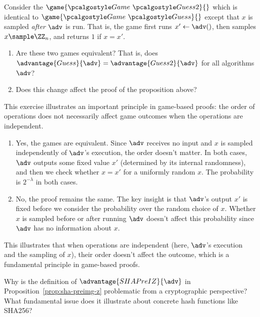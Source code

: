 \begin{exercise}\label{ex:guessing-game-equivalence}
  Consider the $\game{\Game~\algo{Guess2}}{}$ which is identical to $\game{\Game~\algo{Guess}}{}$ except that $x$ is sampled \emph{after} $\adv$ is run.
  That is, the game first runs $x' \gets \adv()$, then samples $x \sample \ZZ_n$, and returns $1$ if $x = x'$.
  \begin{enumerate}
    \item Are these two games equivalent? That is, does $\advantage{Guess}{\adv} = \advantage{Guess2}{\adv}$ for all algorithms $\adv$?
    \item Does this change affect the proof of the proposition above?
  \end{enumerate}
  
  This exercise illustrates an important principle in game-based proofs: the order of operations does not necessarily affect game outcomes when the operations are independent.
\end{exercise}

\ifsolutions
\begin{mysolution}
  \begin{enumerate}
    \item Yes, the games are equivalent.
    Since $\adv$ receives no input and $x$ is sampled independently of $\adv$'s execution, the order doesn't matter.
    In both cases, $\adv$ outputs some fixed value $x'$ (determined by its internal randomness), and then we check whether $x = x'$ for a uniformly random $x$.
    The probability is $2^{-\lambda}$ in both cases.
    
    \item No, the proof remains the same.
    The key insight is that $\adv$'s output $x'$ is fixed before we consider the probability over the random choice of $x$.
    Whether $x$ is sampled before or after running $\adv$ doesn't affect this probability since $\adv$ has no information about $x$.
  \end{enumerate}
  
  This illustrates that when operations are independent (here, $\adv$'s execution and the sampling of $x$), their order doesn't affect the outcome, which is a fundamental principle in game-based proofs.
\end{mysolution}
\fi


\begin{exercise}\label{ex:sha-preimage-problem}
  Why is the definition of $\advantage{SHAPreIZ}{\adv}$ in Proposition~\ref{prop:sha-preimg-z} problematic from a cryptographic perspective?
  What fundamental issue does it illustrate about concrete hash functions like SHA256?
\end{exercise}

